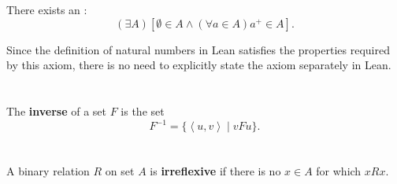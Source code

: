 \documentclass{report}
\newcommand{\pair}[1]{\left< #1 \right>}
\begin{document}
\section{}%

There exists an :
  $$(\exists A)\left[ \emptyset \in A \land (\forall a \in A) a^+ \in A \right].$$

\begin{note}
  Since the definition of natural numbers in Lean satisfies the properties
    required by this axiom, there is no need to explicitly state the axiom
    separately in Lean.
\end{note}

\begin{axiom}

  \statementpadding



\end{axiom}

\section{}%

The \textbf{inverse} of a set $F$ is the set
  $$F^{-1} = \{\pair{u, v} \mid vFu\}.$$

\begin{definition}

  \statementpadding



\end{definition}

\section{}%

A binary relation $R$ on set $A$ is \textbf{irreflexive} if there is no
  $x \in A$ for which $xRx$.

\begin{definition}


\end{definition}
\end{document}
